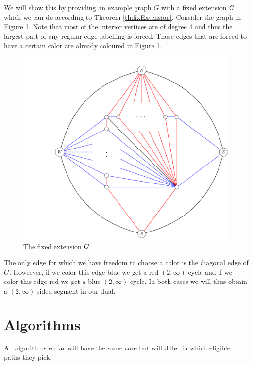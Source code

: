 \documentclass[a4paper]{article}
\theoremstyle{definition}
\newcommand{\scr}[1]{\mathcal{#1}}
\begin{document}
We will show this by providing an example graph $G$ with a fixed extension $\bar{G}$ which we can do according to Theorem \ref{th:fixExtension}. Consider the graph in Figure \ref{fig:2manysidedLowerBound}. Note that most of the interior vertices are of degree $4$ and thus the largest part of any regular edge labelling is forced. Those edges that are forced to have a certain color are already coloured in Figure \ref{fig:2manysidedLowerBound}.


\begin{figure}[h!]
\centering
\includegraphics[scale=.5]{img/2manysidedLowerBound}

\caption{The fixed extension $\bar{G}$
    \label{fig:2manysidedLowerBound}}
\end{figure}

The only edge for which we have freedom to choose a color is the diagonal edge of $G$. Howeever, if we color this edge blue we get a red $(2, \infty)$ cycle and if we color this edge red we get a blue $(2, \infty)$ cycle. In both cases we will thus obtain a $(2,\infty)$-sided segment in our dual.


\section{Algorithms}
All algorithms so far will have the same core but will differ in which eligible paths they pick.    

\renewcommand{\P}{\scr{P}}
\end{document}
